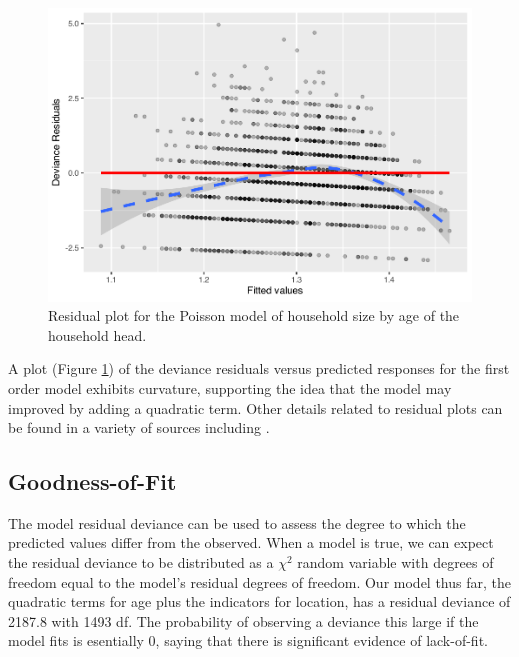 \documentclass[
]{krantz}
\newenvironment{Shaded}{\begin{snugshade}}{\end{snugshade}}
\newcommand{\CommentTok}[1]{\textcolor[rgb]{0.37,0.37,0.37}{\textit{#1}}}
\newcommand{\DecValTok}[1]{\textcolor[rgb]{0.06,0.06,0.06}{#1}}
\newcommand{\KeywordTok}[1]{\textcolor[rgb]{0.27,0.27,0.27}{\textbf{#1}}}
\newcommand{\NormalTok}[1]{#1}
\newcommand{\OperatorTok}[1]{\textcolor[rgb]{0.43,0.43,0.43}{\textbf{#1}}}
\begin{document}
\begin{figure}

{\centering \includegraphics[width=0.6\linewidth]{bookdown-BeyondMLR_files/figure-latex/resid1-1} 

}

\caption{Residual plot for the Poisson model of household size by age of the household head.}\label{fig:resid1}
\end{figure}

A plot (Figure \ref{fig:resid1}) of the deviance residuals versus predicted responses for the first order model exhibits curvature, supporting the idea that the model may improved by adding a quadratic term. Other details related to residual plots can be found in a variety of sources including \citet{McCullagh1989}.

\hypertarget{sec-PoisGOF}{%
\subsection{Goodness-of-Fit}\label{sec-PoisGOF}}

The model residual deviance can be used to assess the degree to which the predicted values differ from the observed. When a model is true, we can expect the residual deviance to be distributed as a \(\chi^2\) random variable with degrees of freedom equal to the model's residual degrees of freedom. Our model thus far, the quadratic terms for age plus the indicators for location, has a residual deviance of 2187.8 with 1493 df. The probability of observing a deviance this large if the model fits is esentially 0, saying that there is significant evidence of lack-of-fit.

\begin{Shaded}
\end{Shaded}
\end{document}
